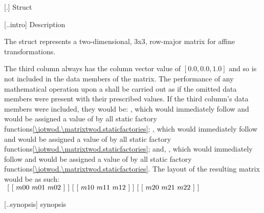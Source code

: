  [\iotwod.\matrixtwod] {Struct }

 [\iotwod.\matrixtwod.intro] { Description}

\pnum
{}%
The  struct represents a two-dimensional, 3x3, row-major 
matrix for affine transformations.

\pnum
The third column always has the column vector value of $[0.0, 0.0, 1.0]$ and so 
is not included in the data members of the matrix. The performance of any 
mathematical operation upon a  shall be carried out as if the 
omitted data members were present with their prescribed values.
\enternote
If the third column's data members were included, they would be: , which would immediately follow  and would be assigned a value 
of  by all static factory 
functions\ref{\iotwod.\matrixtwod.staticfactories}; , which 
would immediately follow  and would be assigned a value of 
 by all static factory 
functions\ref{\iotwod.\matrixtwod.staticfactories}; and, , 
which 
would immediately follow  and would be assigned a value of 
 by all static factory 
functions\ref{\iotwod.\matrixtwod.staticfactories}. The layout of the resulting 
matrix 
would be as such: \\
$~[~[~m00~m01~m02~]~] \\
~[~[~m10~m11~m12~]~] \\
~[~[~m20~m21~m22~]~]$
\exitnote

 [\iotwod.\matrixtwod.synopsis] { synopsis}

